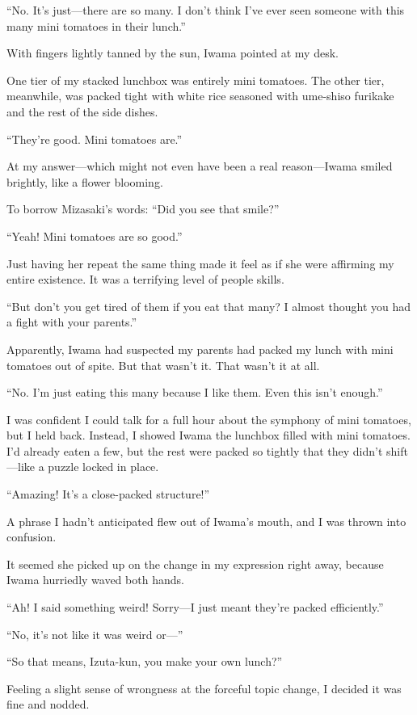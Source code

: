 \documentclass[
    a4paper,
    12pt,
    twoside,
    openany,
    UTF8,
    fontset=windows
]{ctexbook}
\begin{document}
``No. It's just---there are so many. I don't think I've ever seen someone with this many mini tomatoes in their lunch.''

With fingers lightly tanned by the sun, Iwama pointed at my desk.

One tier of my stacked lunchbox was entirely mini tomatoes. The other tier, meanwhile, was packed tight with white rice seasoned with ume-shiso furikake and the rest of the side dishes.

``They're good. Mini tomatoes are.''

At my answer---which might not even have been a real reason---Iwama smiled brightly, like a flower blooming.

To borrow Mizasaki's words: ``Did you see that smile?''

``Yeah! Mini tomatoes are so good.''

Just having her repeat the same thing made it feel as if she were affirming my entire existence. It was a terrifying level of people skills.

``But don't you get tired of them if you eat that many? I almost thought you had a fight with your parents.''

Apparently, Iwama had suspected my parents had packed my lunch with mini tomatoes out of spite. But that wasn't it. That wasn't it at all.

``No. I'm just eating this many because I like them. Even this isn't enough.''

I was confident I could talk for a full hour about the symphony of mini tomatoes, but I held back. Instead, I showed Iwama the lunchbox filled with mini tomatoes. I'd already eaten a few, but the rest were packed so tightly that they didn't shift---like a puzzle locked in place.

``Amazing! It's a close-packed structure!''

A phrase I hadn't anticipated flew out of Iwama's mouth, and I was thrown into confusion.

It seemed she picked up on the change in my expression right away, because Iwama hurriedly waved both hands.

``Ah! I said something weird! Sorry---I just meant they're packed efficiently.''

``No, it's not like it was weird or---''

``So that means, Izuta-kun, you make your own lunch?''

Feeling a slight sense of wrongness at the forceful topic change, I decided it was fine and nodded.
\end{document}
